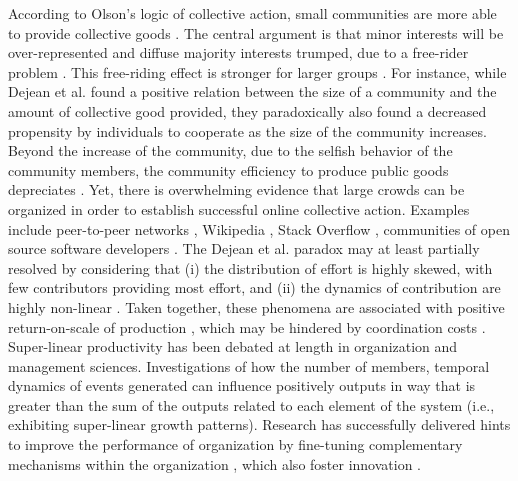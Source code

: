 \documentclass[unnumsec,webpdf,contemporary,large]{oup-authoring-template}%
\theoremstyle{thmstyleone}%
\theoremstyle{thmstyletwo}%
\theoremstyle{thmstylethree}%
\begin{document}
According to Olson's logic of collective action, small communities are more able to provide collective goods \cite{olson_logic_1971}. The central argument is that minor interests will be over-represented and diffuse majority interests trumped, due to a free-rider problem \cite{anesi_moral_2009,varian2004system}. This free-riding effect is stronger for larger groups \cite{esteban_collective_2001}. For instance, while Dejean et al. \cite{dejean_olsons_2010} found a positive relation between the size of a community and the amount of collective good provided, they paradoxically also found a decreased propensity by individuals to cooperate as the size of the community increases. Beyond the increase of the community, due to the selfish behavior of the community members, the community efficiency to produce public goods depreciates \cite{KOUTSOUPIAS200965}.
Yet, there is overwhelming evidence that large crowds can be organized in order to establish successful online collective action. Examples include peer-to-peer networks \cite{asvanund_empirical_2004, dejean_olsons_2010},  Wikipedia \cite{klein_virtuous_2015},  Stack Overflow \cite{wang_empirical_2013}, communities of open source software developers \cite{hippel_open_2003,sornette2014much}. %
The Dejean et al. paradox may at least partially resolved by considering that (i) the distribution of effort is highly skewed, with few contributors providing most effort, and (ii) the dynamics of contribution are highly non-linear \cite{sornette2014much,maillart_aristotle_2019,muric_collaboration_2019}. Taken together, these phenomena are associated with positive return-on-scale of production \cite{sornette2014much}, which may be hindered by coordination costs \cite{scholtes_aristotle_2016}. Super-linear productivity has been debated at length in organization and management sciences. Investigations of how the number of members, temporal dynamics of events generated can influence positively outputs in way that is greater than the sum of the outputs related to each element of the system (i.e., exhibiting super-linear growth patterns). Research has successfully delivered hints to improve the performance of organization \cite{tziner_effects_1985, sundstrom_work_1990, cohen_what_1997, neuman_team_1999} by fine-tuning complementary mechanisms within the organization \cite{ennen_whole_2010}, which also foster innovation \cite{sacramento_team_2006}.
\end{document}
